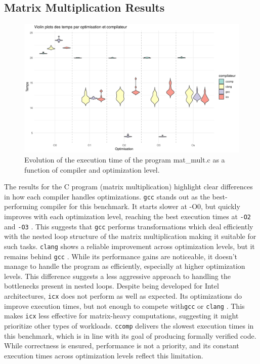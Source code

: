 \documentclass{rapport}
\newcommand{\gcc}{\texttt{gcc} }
\newcommand{\icx}{\texttt{icx} }
\newcommand{\clang}{\texttt{clang} }
\newcommand{\comp}{\texttt{ccomp} }
\newcommand{\optitwo}{\texttt{-O2} }
\newcommand{\optithree}{\texttt{-O3} }
\begin{document}
\subsection{Matrix Multiplication Results}
\begin{figure}[H]
\centering
\includegraphics[width=1\textwidth]{img/plots/violin_plot_mat_mult.png}
\caption{Evolution of the execution time of the program mat\_mult.c as a function of compiler and optimization level.}
\label{fig:image1}
\end{figure}
The results for the C program (matrix multiplication) highlight clear differences in how each compiler handles optimizations.\newline
\gcc stands out as the best-performing compiler for this benchmark. It starts slower at -O0, but quickly improves with each optimization level, reaching the best execution times at 
\optitwo and \optithree. This suggests that \gcc performs transformations which deal efficiently with the nested loop structure of the matrix multiplication making it suitable for such tasks.
\newline
\clang shows a reliable improvement across optimization levels, but it remains behind \gcc. While its performance gains are noticeable, it doesn’t manage to handle the program as 
efficiently, especially at higher optimization levels. This difference suggests a less aggressive approach to handling the bottlenecks present in nested loops. \newline
Despite being developed for Intel architectures, \icx does not perform as well as expected. Its optimizations do improve execution times, but not enough to compete with\gcc or \clang. 
This makes \icx less effective for matrix-heavy computations, suggesting it might prioritize other types of workloads. \newline
\comp delivers the slowest execution times in this benchmark, which is in line with its goal of producing formally verified code. While correctness is ensured, 
performance is not a priority, and its constant execution times across optimization levels reflect this limitation.
\end{document}
